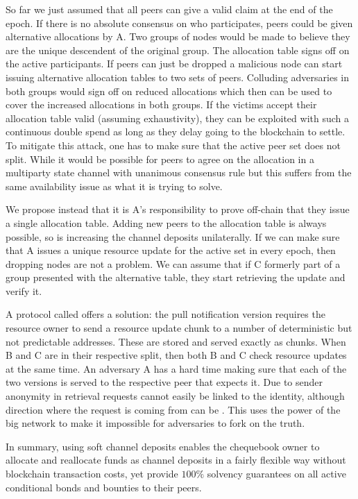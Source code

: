 So far we just assumed that all peers can give a valid claim at the end of the epoch. 
If there is no absolute consensus on who participates, 
peers could be given alternative allocations by A. Two groups of nodes would be made to believe they are the unique descendent of the original group. The allocation table signs off on the active participants.
If peers can just be dropped a malicious node can start issuing alternative allocation tables to two sets of peers. Colluding adversaries in both groups would sign off on reduced allocations which then can be used to cover the increased allocations in both groups. If the victims accept their allocation table valid (assuming exhaustivity), they can be exploited with such a continuous double spend as long as they delay going to the blockchain to settle. To mitigate this attack, one has to make sure that the active peer set does not split. While it would be possible for peers to agree on the allocation in a multiparty state channel with unanimous consensus rule but this suffers from the same availability issue as what it is trying to solve.

We propose instead that it is A's responsibility to prove off-chain that they issue a single allocation table. 
Adding new peers to the allocation table is always possible, so is increasing the channel deposits unilaterally. 
If we can make sure that A issues a unique resource update for the active set in every epoch, then dropping nodes are not a problem. 
We can assume that if C formerly part of a group presented with the alternative table, they start retrieving the update and verify it. 

A protocol called  offers a solution: 
the pull notification version requires the resource owner to send a resource update chunk to a number of 
deterministic but not predictable addresses. These are stored and served exactly as chunks. 
When B and C are in their respective split, then both B and C check resource updates at the same time. An adversary A has a hard time making sure that each of the two versions is served to the respective peer that expects it. Due to sender anonymity in retrieval requests cannot easily be linked to the identity, although direction where the request is coming from can be .
This uses the power of the big network to make it impossible for adversaries to fork on the truth.

In summary, using soft channel deposits enables the chequebook owner to allocate and reallocate funds
as channel deposits in a fairly flexible way without blockchain transaction costs,
yet provide $100\%$ solvency guarantees on all active conditional bonds and bounties to their peers.




